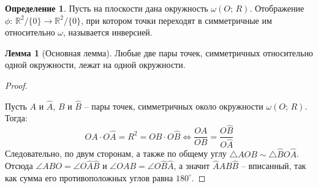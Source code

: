 \documentclass[12pt]{article}
\theoremstyle{definition}
\newtheorem{lemma}[theorem]{Лемма}
\newtheorem{definition}{Определение}
\newcommand{\R}{\mathbb{R}}
\begin{document}
    \begin{definition}
        Пусть на плоскости дана окружность $\omega(O;\,R)$. Отображение $\phi:\,\R^2/\{0\}\longrightarrow \R^2/\{0\}$, при котором точки переходят в симметричные им относительно $\omega$, называется инверсией.
    \end{definition}
    \begin{lemma}[Основная лемма]
        Любые две пары точек, симметричных относительно одной окружности, лежат на одной окружности.
    \end{lemma}
    \begin{proof}
        $ $\newline
        \begin{center}
        \end{center}
        Пусть $A$ и $\hat{A}$, $B$ и $\hat{B}$ -- пары точек, симметричных около окружности $\omega(O;\,R)$. Тогда:
        $$OA\cdot O\hat{A}=R^2=OB\cdot O\hat{B}\Longleftrightarrow \frac{OA}{OB}=\frac{O\hat{B}}{O\hat{A}}$$
        Следовательно, по двум сторонам, а также по общему углу $\triangle AOB \sim \triangle \hat{B}O\hat{A}$. Отсюда $\angle ABO=\angle O\hat{A}\hat{B}$ и $\angle OAB=\angle O\hat{B}\hat{A}$, а значит $\hat{A}AB\hat{B}$ -- вписанный, так как сумма его противоположных углов равна $180^{\circ}$.
    \end{proof}
\end{document}
